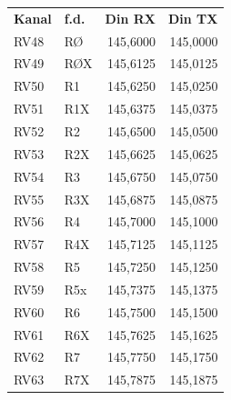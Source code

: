 \begin{tabular}{llrr}
	\textbf{Kanal} & \textbf{f.d.} & \textbf{Din RX} & \textbf{Din TX} \\
	RV48           & RØ            &        145,6000 &        145,0000 \\
	RV49           & RØX           &        145,6125 &        145,0125 \\
	RV50           & R1            &        145,6250 &        145,0250 \\
	RV51           & R1X           &        145,6375 &        145,0375 \\
	RV52           & R2            &        145,6500 &        145,0500 \\
	RV53           & R2X           &        145,6625 &        145,0625 \\
	RV54           & R3            &        145,6750 &        145,0750 \\
	RV55           & R3X           &        145,6875 &        145,0875 \\
	RV56           & R4            &        145,7000 &        145,1000 \\
	RV57           & R4X           &        145,7125 &        145,1125 \\
	RV58           & R5            &        145,7250 &        145,1250 \\
	RV59           & R5x           &        145,7375 &        145,1375 \\
	RV60           & R6            &        145,7500 &        145,1500 \\
	RV61           & R6X           &        145,7625 &        145,1625 \\
	RV62           & R7            &        145,7750 &        145,1750 \\
	RV63           & R7X           &        145,7875 &        145,1875
\end{tabular}